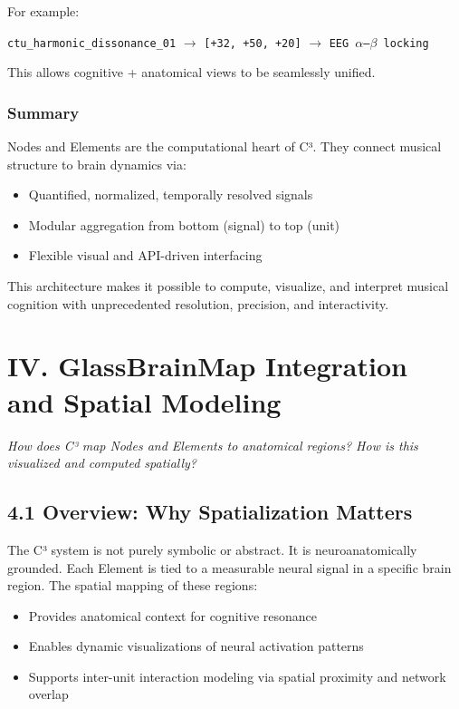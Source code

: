 \documentclass[10pt]{article}
\begin{document}
For example:

\texttt{ctu\_harmonic\_dissonance\_01} $\rightarrow$ \texttt{[+32, +50, +20]} $\rightarrow$ \texttt{EEG $\alpha$–$\beta$ locking}

This allows cognitive + anatomical views to be seamlessly unified.

\subsubsection*{Summary}

Nodes and Elements are the computational heart of C³. They connect musical structure to brain dynamics via:

\begin{itemize}
    \item Quantified, normalized, temporally resolved signals
    \item Modular aggregation from bottom (signal) to top (unit)
    \item Flexible visual and API-driven interfacing
\end{itemize}

This architecture makes it possible to compute, visualize, and interpret musical cognition with unprecedented resolution, precision, and interactivity.

\section*{IV. GlassBrainMap Integration and Spatial Modeling}

\textit{How does C³ map Nodes and Elements to anatomical regions? How is this visualized and computed spatially?}

\subsection*{4.1 Overview: Why Spatialization Matters}

The C³ system is not purely symbolic or abstract. It is neuroanatomically grounded. Each Element is tied to a measurable neural signal in a specific brain region. The spatial mapping of these regions:

\begin{itemize}
    \item Provides anatomical context for cognitive resonance
    \item Enables dynamic visualizations of neural activation patterns
    \item Supports inter-unit interaction modeling via spatial proximity and network overlap
\end{itemize}
\end{document}
